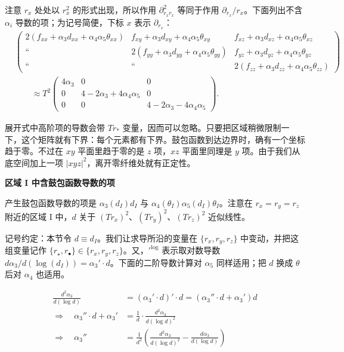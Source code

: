 注意 $r_x$ 处处以 $r_x^2$ 的形式出现，所以作用 $\partial^2_{r_xr_x}$ 等同于作用 $\partial_{r_x}/r_x$。下面列出不含 $\alpha_i$ 导数的项；为记号简便，下标 $x$ 表示 $\partial_{r_x}$：
\[
\begin{aligned}
&\begin{pmatrix}
2(f_{xx}+\alpha_3d_{xx}+\alpha_4\alpha_5\theta_{xx}) & f_{xy}+\alpha_3d_{xy}+\alpha_4\alpha_5\theta_{xy} & f_{xz}+\alpha_3d_{xz}+\alpha_4\alpha_5\theta_{xz}\\
\text{“} & 2(f_{yy}+\alpha_3d_{yy}+\alpha_4\alpha_5\theta_{yy}) & f_{yz}+\alpha_3d_{yz}+\alpha_4\alpha_5\theta_{yz}\\
\text{“} & \text{“} & 2(f_{zz}+\alpha_3d_{zz}+\alpha_4\alpha_5\theta_{zz})
\end{pmatrix}\\
&\qquad\approx T^2
\begin{pmatrix}
4\alpha_3 & 0 & 0\\
0 & 4-2\alpha_3+4\alpha_4\alpha_5 & 0\\
0 & 0 & 4-2\alpha_3-4\alpha_4\alpha_5
\end{pmatrix}.
\end{aligned}
\]

展开式中高阶项的导数会带 $Tr_*$ 变量，因而可以忽略。只要把区域稍微限制一下，这个矩阵就有下界：每个元素都有下界。鼓包函数到达边界时，确有一个坐标趋于零。不过在 $xy$ 平面里趋于零的是 $z$ 项，$xz$ 平面里同理是 $y$ 项。由于我们从底空间加上一项 $|xyz|^2$，离开零纤维处就有正定性。

\medskip
\noindent\textbf{区域 I 中含鼓包函数导数的项}\par
产生鼓包函数导数的项是 $\alpha_3(d_I)d_I$ 与 $\alpha_4(\theta_I)\alpha_5(d_I)\theta_I$。注意在 $r_x=r_y=r_z$ 附近的区域 I 中，$d$ 关于 $(Tr_x)^2$、$(Tr_y)^2$、$(Tr_z)^2$ 近似线性。

记号约定：本节令 $d\equiv d_I$。我们让求导所沿的变量在 $\{r_x,r_y,r_z\}$ 中变动，并把这组变量记作 $\{r_\star,r_\bullet\}\in\{r_x,r_y,r_z\}$。又，$'^{\log}$ 表示取对数导数 $d\alpha_3/d(\log(d_I))=\alpha_3'\cdot d$。下面的二阶导数计算对 $\alpha_5$ 同样适用；把 $d$ 换成 $\theta$ 后对 $\alpha_4$ 也适用。

\begin{align*}
\frac{d^2\alpha_3}{d(\log d)}&=(\alpha_3'\cdot d)'\cdot d=(\alpha_3''\cdot d+\alpha_3')d\\
\Longrightarrow\quad\alpha_3''\cdot d+\alpha_3'&=\frac{1}{d}\cdot\frac{d^2\alpha_3}{d(\log d)^2}\\
\Longrightarrow\quad\alpha_3''&=\frac{1}{d^2}\left(\frac{d^2\alpha_3}{d(\log d)^2}-\frac{d\alpha_3}{d(\log d)}\right)
\end{align*}

